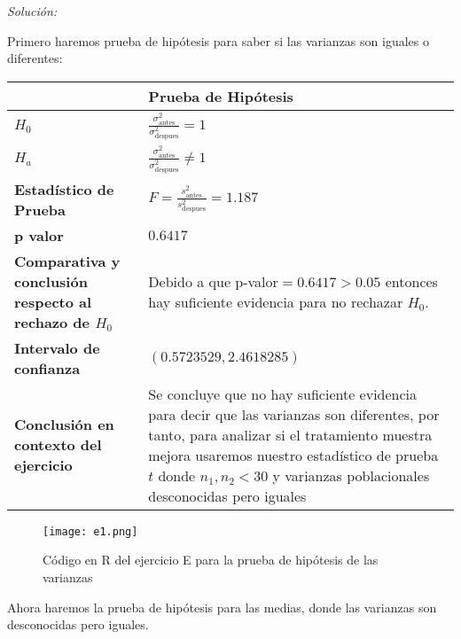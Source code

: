 \documentclass[12pt]{article}
\newenvironment{sol}
    {\emph{Solución:}
    }
    {
    }
\begin{document}
\begin{sol}
Primero haremos prueba de hipótesis para saber si las varianzas son iguales o diferentes:
\pagebreak
\begin{table}[h!]
\centering
\begin{tabular}{|>{\raggedright\arraybackslash}m{6cm}|>{\raggedright\arraybackslash}m{6cm}|}
\hline
 & \textbf{Prueba de Hipótesis} \\ \hline
$H_0$ & \vspace{0.5cm}$\frac{\sigma_{\text{antes}}^2}{\sigma_{\text{despues}
}^2}=1$ \vspace{0.5cm}\\ \hline
$H_a$ & \vspace{0.5cm} $\frac{\sigma_{\text{antes}}^2}{\sigma_{\text{despues}
}^2}\neq1$ \vspace{0.5cm}\\ \hline
\textbf{Estadístico de Prueba} & \vspace{0.5cm}$F = \frac{s_\text{antes}^2}{s_\text{despues}^2}= 1.187$\vspace{0.5cm} \\ \hline
\textbf{p valor} & $0.6417$ \\ \hline
\textbf{Comparativa y conclusión respecto al rechazo de $H_0$} & Debido a que p-valor$=0.6417>0.05$ entonces hay suficiente evidencia para no rechazar $H_0$. \\ \hline
\textbf{Intervalo de confianza} & $( 0.5723529, 2.4618285)$ \\ \hline
\textbf{Conclusión en contexto del ejercicio} & Se concluye que no hay suficiente evidencia para decir que las varianzas son diferentes, por tanto, para analizar si el tratamiento muestra mejora usaremos nuestro estadístico de prueba $t$ donde $n_1 ,n_2 < 30$ y varianzas poblacionales desconocidas pero iguales \\ \hline
\end{tabular}
\label{tab:hipotesis}
\end{table}
\pagebreak

\begin{figure}[h]  %
    \centering      %
    \texttt{[image: e1.png]} 
    \caption{Código en R del ejercicio E para la prueba de hipótesis de las varianzas}
\end{figure}

Ahora haremos la prueba de hipótesis para las medias, donde las varianzas son desconocidas pero iguales.


\end{sol}
\end{document}
